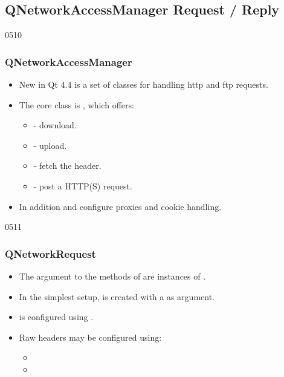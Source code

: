 \subsection{QNetworkAccessManager Request / Reply}

\begin{slide}{0510}
\frametitle{QNetworkAccessManager} \label{QNetworkAccess}
\begin{itemize}
\item New in Qt 4.4 is a set of classes for handling http and ftp requests.
\item The core class is , which offers:\\
  \begin{itemize}
  \item {} - download.
  \item {} - upload.
  \item {} - fetch the header.
  \item {} - post a HTTP(S) request.
\end{itemize}
\item In addition  and
   configure proxies and cookie
  handling. %
\end{itemize}
\end{slide}

\begin{slide}{0511}
\frametitle{QNetworkRequest}
\begin{itemize}
\item The argument to the methods of  are
  instances of .
\item In the simplest setup,  is created with a
   as argument.
\item {} is configured using
  .
\item Raw headers may be configured using:
  \begin{itemize}
  \item {}
  \item {}
  \end{itemize}
\end{itemize}
\end{slide}

